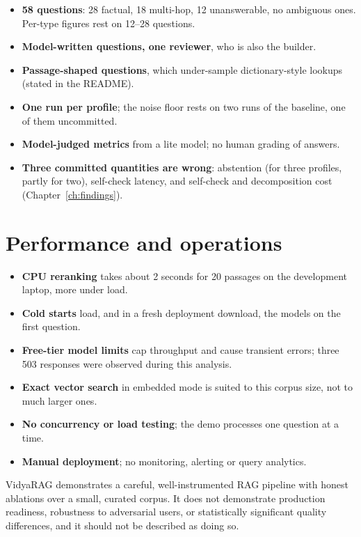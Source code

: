 \begin{itemize}
  \item \textbf{58 questions}: 28 factual, 18 multi-hop, 12 unanswerable, no ambiguous ones. Per-type figures rest on 12--28 questions.
  \item \textbf{Model-written questions, one reviewer}, who is also the builder.
  \item \textbf{Passage-shaped questions}, which under-sample dictionary-style lookups (stated in the README).
  \item \textbf{One run per profile}; the noise floor rests on two runs of the baseline, one of them uncommitted.
  \item \textbf{Model-judged metrics} from a lite model; no human grading of answers.
  \item \textbf{Three committed quantities are wrong}: abstention (for three profiles, partly for two), self-check latency, and self-check and decomposition cost (Chapter~\ref{ch:findings}).
\end{itemize}

\section{Performance and operations}

\begin{itemize}
  \item \textbf{CPU reranking} takes about 2 seconds for 20 passages on the development laptop, more under load.
  \item \textbf{Cold starts} load, and in a fresh deployment download, the models on the first question.
  \item \textbf{Free-tier model limits} cap throughput and cause transient errors; three 503 responses were observed during this analysis.
  \item \textbf{Exact vector search} in embedded mode is suited to this corpus size, not to much larger ones.
  \item \textbf{No concurrency or load testing}; the demo processes one question at a time.
  \item \textbf{Manual deployment}; no monitoring, alerting or query analytics.
\end{itemize}

\begin{inferred}
VidyaRAG demonstrates a careful, well-instrumented RAG pipeline with honest ablations over a small, curated corpus. It does not demonstrate production readiness, robustness to adversarial users, or statistically significant quality differences, and it should not be described as doing so.
\end{inferred}
